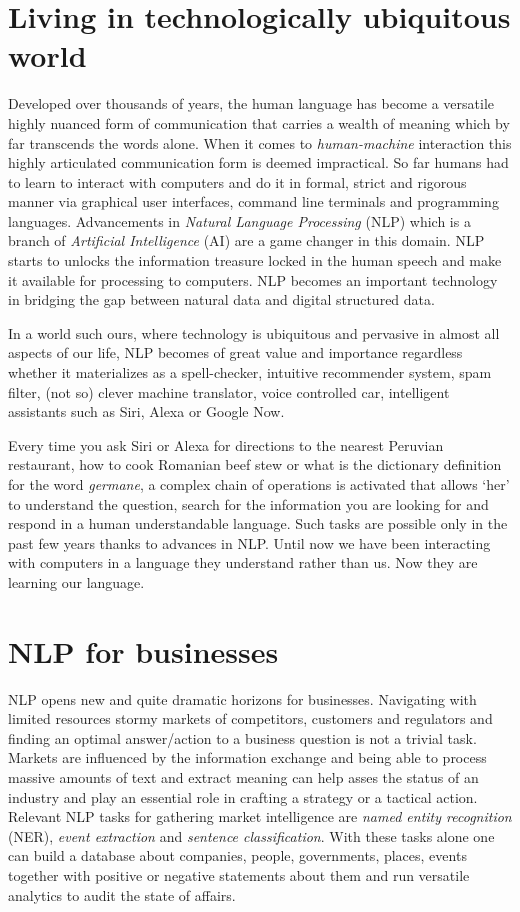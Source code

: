
\section{Living in technologically ubiquitous world}
\label{sec:motivation}
Developed over thousands of years, the human language has become a versatile highly nuanced form of communication that carries a wealth of meaning which by far transcends the words alone. When it comes to \textit{human-machine} interaction this highly articulated communication form is deemed impractical. So far humans had to learn to interact with computers and do it in  formal, strict and rigorous manner via graphical user interfaces, command line terminals and programming languages. Advancements in \textit{Natural Language Processing} (NLP) which is a branch of \textit{Artificial Intelligence} (AI) are a game changer in this domain. NLP starts to unlocks the information treasure locked in the human speech and make it available for processing to computers. NLP becomes an important technology in bridging the gap between natural data and digital structured data.

In a world such ours, where technology is ubiquitous and pervasive in almost all aspects of our life, NLP becomes of great value and importance regardless whether it materializes as a spell-checker, intuitive recommender system, spam filter, (not so) clever machine translator, voice controlled car, intelligent assistants such as Siri, Alexa or Google Now. 

Every time you ask Siri or Alexa for directions to the nearest Peruvian restaurant, how to cook Romanian beef stew or what is the dictionary definition for the word \textit{germane}, a complex chain of operations is activated that allows `her' to understand the question, search for the information you are looking for and respond in a human understandable language. Such tasks are possible only in the past few years thanks to advances in NLP. Until now we have been interacting with computers in a language they understand rather than us. Now they are learning our language. 

\section{NLP for businesses}
\label{sec:motivation-business}
NLP opens new and quite dramatic horizons for businesses. Navigating with limited resources stormy markets of competitors, customers and regulators and finding an optimal answer/action to a business question is not a trivial task. 
Markets are influenced by the information exchange and being able to process massive amounts of text and extract meaning can help asses the status of an industry and play an essential role in crafting a strategy or a tactical action. 
Relevant NLP tasks for gathering market intelligence are \textit{named entity recognition} (NER), \textit{event extraction} and \textit{sentence classification}. With these tasks alone one can build a database about companies, people, governments, places, events together with positive or negative statements about them and run versatile analytics to audit the state of affairs.

